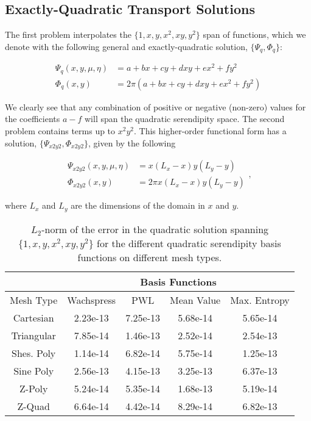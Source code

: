 \documentclass[preprint,10pt]{elsarticle}
\begin{document}
\subsection{Exactly-Quadratic Transport Solutions}

The first problem interpolates the $\{ 1, x, y, x^2, xy, y^2 \}$ span of functions, which we denote with the following general and exactly-quadratic solution, $\{\Psi_q, \Phi_q\}$:

\begin{equation}
\label{eq::Results_Quadratic_fluxsols}
\begin{aligned}
\Psi_q (x,y,\mu,\eta) &= a + bx + c y+ d xy + e x^2 + fy^2 \\
\Phi_q (x,y) &= 2 \pi \left(  a + bx + c y+ d xy + e x^2 + fy^2 \right)
\end{aligned} 
\end{equation}

\noindent We clearly see that any combination of positive or negative (non-zero) values for the coefficients $a-f$ will span the quadratic serendipity space. The second problem contains terms up to $x^2 y^2$. This higher-order functional form has a solution, $\{ \Psi_{x2y2}, \Phi_{x2y2}\}$, given by the following

\begin{equation}
\label{eq::Results_x2y2_fluxsols}
\begin{aligned}
\Psi_{x2y2} (x,y,\mu,\eta) &= x \left(L_x - x \right) y \left(L_y - y \right) \\
\Phi_{x2y2} (x,y) &= 2 \pi x \left(L_x - x \right) y \left(L_y - y \right) 
\end{aligned} ,
\end{equation}

\noindent where $L_x$ and $L_y$ are the dimensions of the domain in $x$ and $y$.

\begin{table}[hbt]
\caption{$L_2$-norm of the error in the quadratic solution spanning $\{ 1, x, y, x^2, xy, y^2 \}$ for the different quadratic serendipity basis functions on different mesh types.}
\centering
\def\arraystretch{1.25}
\begin{tabular}{|c|c|c|c|c|}
\hline
& \multicolumn{4}{c}{Basis Functions}\vline\\
\hline
Mesh Type & Wachspress & PWL& Mean Value& Max. Entropy \\
\hline
Cartesian&2.23e-13&7.25e-13&5.68e-14&5.65e-14\\
Triangular&7.85e-14&1.46e-13&2.52e-14&2.54e-13\\
Shes. Poly&1.14e-14&6.82e-14&5.75e-14&1.25e-13\\
Sine Poly&2.56e-13&4.15e-13&3.25e-13&6.37e-13\\
Z-Poly&5.24e-14&5.35e-14&1.68e-13&5.19e-14\\
Z-Quad&6.64e-14&4.42e-14&8.29e-14&6.82e-13\\
\hline
\end{tabular}
\end{table}
\end{document}
